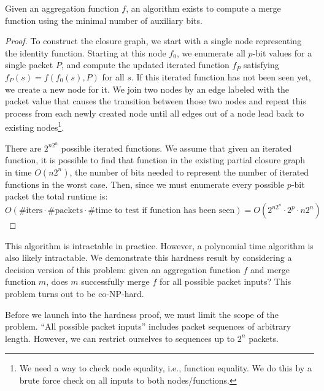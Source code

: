 \begin{theorem}
Given an aggregation function $f$, an algorithm exists to compute a merge function using the minimal number of auxiliary bits.
\end{theorem}
\begin{proof}
To construct the closure graph, we start with a single node representing the
identity function. Starting at this node $f_0$, we enumerate all $p$-bit values for a
single packet $P$, and compute the updated iterated function $f_P$ satisfying $f_P(s) = f(f_0(s), P)$ for all $s$.
If this iterated function has not been seen yet, we create a new node for it.
We join two nodes by an edge labeled
with the packet value that causes the transition between those two nodes and
repeat this process from each newly created node until all edges out of a node
lead back to existing nodes\footnote{We need a way to check node equality,
i.e., function equality. We do this by a brute force check on all inputs to
both nodes/functions.}.

There are $2^{n2^n}$ possible iterated functions. We assume that given an iterated function,
it is possible to find that function in the existing partial closure graph in time $O(n2^n)$,
the number of bits needed to represent the number of iterated functions in the worst case.
Then, since we must enumerate every possible $p$-bit packet the total runtime is:
\[ O(\text{\# iters} \cdot \text{\# packets} \cdot \text{\# time to test if function has been seen}) =  O\left(2^{n2^n} \cdot 2^p \cdot n2^n\right) \]
\end{proof}

This algorithm is intractable in practice. However, a polynomial time algorithm is also likely intractable.
We demonstrate this hardness result by considering a decision version of this problem:
given an aggregation function $f$ and merge function $m$, does $m$ successfully merge $f$ for all possible packet inputs?
This problem turns out to be co-NP-hard.

Before we launch into the hardness proof, we must limit the scope of the problem. ``All possible packet inputs'' includes
packet sequences of arbitrary length. However, we can restrict ourselves to sequences up to $2^n$ packets.

